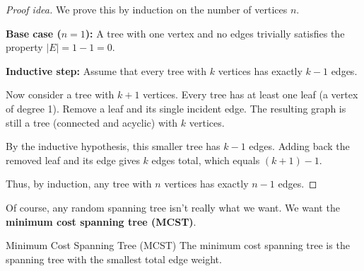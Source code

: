 \begin{proof}[Proof idea]
We prove this by induction on the number of vertices \( n \).

\textbf{Base case (\( n = 1 \)):}  
A tree with one vertex and no edges trivially satisfies the property \( |E| = 1 - 1 = 0 \).

\begin{center}
\end{center}

\textbf{Inductive step:}  
Assume that every tree with \( k \) vertices has exactly \( k - 1 \) edges.

Now consider a tree with \( k + 1 \) vertices. Every tree has at least one leaf (a vertex of degree 1). Remove a leaf and its single incident edge. The resulting graph is still a tree (connected and acyclic) with \( k \) vertices.

By the inductive hypothesis, this smaller tree has \( k - 1 \) edges. Adding back the removed leaf and its edge gives \( k \) edges total, which equals \( (k + 1) - 1 \).

\begin{center}
\vspace{1cm}
\end{center}

Thus, by induction, any tree with \( n \) vertices has exactly \( n - 1 \) edges.
\end{proof}

Of course, any random spanning tree isn't really what we want.  We want the \textbf{minimum cost spanning tree (MCST)}.

\begin{definition}{Minimum Cost Spanning Tree (MCST)}
The minimum cost spanning tree is the spanning tree with the smallest total edge weight.  
\end{definition}

